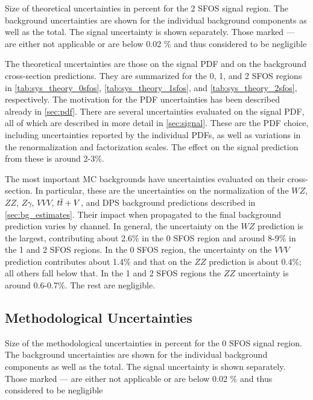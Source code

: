 \begin{table}[ht]
\centering

\caption{Size of theoretical uncertainties in percent for the 2 SFOS signal region. The background uncertainties are shown for the individual background components as well as the total. The signal uncertainty is shown separately. Those marked --- are either not applicable or are below 0.02 \% and thus considered to be negligible}
\label{tab:sys_theory_2sfos}
\end{table}

The theoretical uncertainties are those on the signal PDF and 
on the background cross-section predictions.
They are summarized for the 0, 1, and 2 SFOS regions
in \tab\ref{tab:sys_theory_0sfos}, 
\tab\ref{tab:sys_theory_1sfos}, and
\tab\ref{tab:sys_theory_2sfos}, respectively.
The motivation for the PDF uncertainties has been described
already in \sec\ref{sec:pdf}. 
There are several uncertainties evaluated on the signal PDF, all of which
are described in more detail in \sec\ref{sec:signal}. These
are the PDF choice, including uncertainties reported by the individual
PDFs, as well as variations in the renormalization and factorization scales.
The effect on the signal prediction from these is around 2-3\%.

The most important MC backgrounds have uncertainties evaluated on their
cross-section.  In particular, these are the uncertainties on the 
normalization of the $WZ$, $ZZ$, $Z\gamma$, $VVV$, $t\overline{t}+V$, 
and DPS background predictions
described in \sec\ref{sec:bg_estimates}.
Their impact when propagated to the final background prediction
varies by channel. In general, the uncertainty on the $WZ$ prediction is the 
largest, contributing about 2.6\% in the 0 SFOS region and around 8-9\%
in the 1 and 2 SFOS regions.  In the 0 SFOS region, the uncertainty 
on the $VVV$ prediction contributes about 1.4\% and that on the $ZZ$ prediction
is about 0.4\%; all others fall below that. 
In the 1 and 2 SFOS regions the $ZZ$ uncertainty is around 0.6-0.7\%. 
The rest are negligible. 

\subsection{Methodological Uncertainties}

\begin{table}[ht!]
\centering

\caption{Size of the methodological uncertainties in percent for the 0 SFOS signal region. The background uncertainties are shown for the individual background components as well as the total. The signal uncertainty is shown separately. Those marked --- are either not applicable or are below 0.02 \% and thus considered to be negligible}
\label{tab:sys_meth_0sfos}
\end{table}

